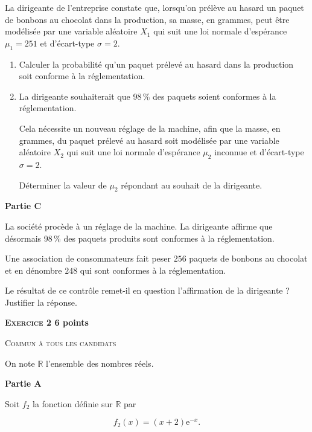 \documentclass[10pt,a4paper]{article}
\newcommand{\R}{\mathbb{R}}
\begin{document}
La dirigeante de l'entreprise constate que, lorsqu'on prélève au hasard un paquet de bonbons
au chocolat dans la production, sa masse, en grammes, peut être modélisée par une variable
aléatoire $X_1$ qui suit une loi normale d'espérance $\mu_1 = 251$ et d'écart-type $\sigma = 2$.

\medskip

\begin{enumerate}
\item Calculer la probabilité qu'un paquet prélevé au hasard dans la production soit
conforme à la réglementation.
\item La dirigeante souhaiterait que 98\,\% des paquets soient conformes à la réglementation.

Cela nécessite un nouveau réglage de la machine, afin que la masse, en grammes, du
paquet prélevé au hasard soit modélisée par une variable aléatoire $X_2$ qui suit une loi
normale d'espérance $\mu_2$ inconnue et d'écart-type $\sigma = 2$.

Déterminer la valeur de $\mu_2$ répondant au souhait de la dirigeante.
\end{enumerate}

\bigskip

\textbf{Partie C}

\medskip

La société procède à un réglage de la machine. La dirigeante affirme que désormais 98\,\% des
paquets produits sont conformes à la réglementation.

Une association de consommateurs fait peser $256$ paquets de bonbons au chocolat et en
dénombre $248$ qui sont conformes à la réglementation.

Le résultat de ce contrôle remet-il en question l'affirmation de la dirigeante ? Justifier la
réponse.

\newpage

\textbf{\textsc{Exercice 2} \hfill 6 points}

\textsc{Commun à tous les candidats}

\bigskip

On note $\R$ l'ensemble des nombres réels.

\medskip

\textbf{Partie A}

\medskip

Soit $f_2$ la fonction définie sur $\R$ par 

\[f_2(x) = (x + 2)\text{e}^{-x}.\]
\end{document}

